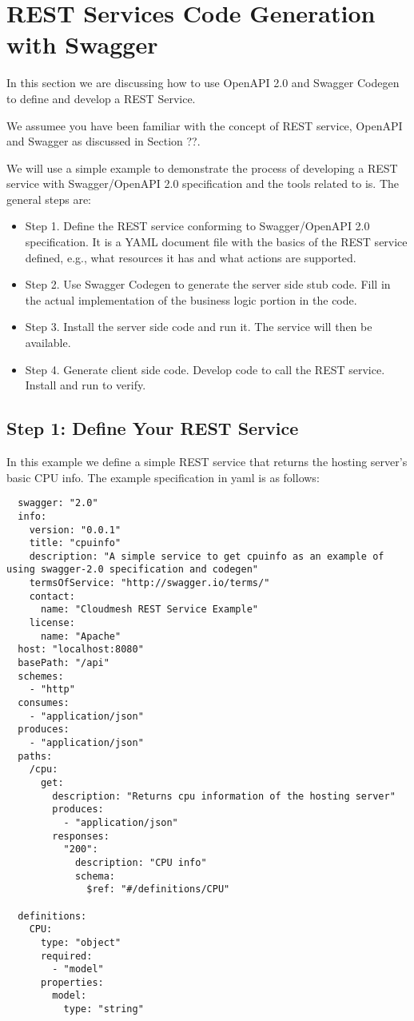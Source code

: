 \chapter{REST Services Code Generation with
Swagger}

In this section we are discussing how to use OpenAPI 2.0 and Swagger
Codegen to define and develop a REST Service.

We assumee you have been familiar with the concept of REST service,
OpenAPI and Swagger as discussed in Section ??.

We will use a simple example to demonstrate the process of developing a
REST service with Swagger/OpenAPI 2.0 specification and the tools
related to is. The general steps are:

\begin{itemize}
\item
  Step 1. Define the REST service conforming to Swagger/OpenAPI 2.0
  specification. It is a YAML document file with the basics of the REST
  service defined, e.g., what resources it has and what actions are
  supported.
\item
  Step 2. Use Swagger Codegen to generate the server side stub code.
  Fill in the actual implementation of the business logic portion in the
  code.
\item
  Step 3. Install the server side code and run it. The service will then
  be available.
\item
  Step 4. Generate client side code. Develop code to call the REST
  service. Install and run to verify.
\end{itemize}

\section{Step 1: Define Your REST  Service}
\label{s:step-1-define-your-rest-service}

In this example we define a simple REST service that returns the hosting
server's basic CPU info. The example specification in yaml is as
follows:

\begin{lstlisting}
  swagger: "2.0"
  info: 
    version: "0.0.1"
    title: "cpuinfo"
    description: "A simple service to get cpuinfo as an example of using swagger-2.0 specification and codegen"
    termsOfService: "http://swagger.io/terms/"
    contact: 
      name: "Cloudmesh REST Service Example"
    license: 
      name: "Apache"
  host: "localhost:8080"
  basePath: "/api"
  schemes: 
    - "http"
  consumes: 
    - "application/json"
  produces: 
    - "application/json"
  paths: 
    /cpu:
      get: 
        description: "Returns cpu information of the hosting server"
        produces: 
          - "application/json"
        responses: 
          "200":
            description: "CPU info"
            schema: 
              $ref: "#/definitions/CPU"

  definitions:
    CPU:
      type: "object"
      required: 
        - "model"
      properties: 
        model:
          type: "string"
\end{lstlisting}


